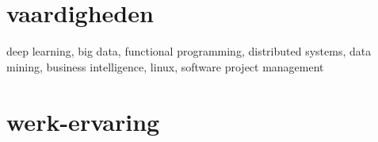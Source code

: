 \documentclass[]{friggeri-cv}
\begin{document}
\section{vaardigheden}

deep learning,
big data,
functional programming,
distributed systems,
data mining,
business intelligence,
linux,
software project management

\section{werk-ervaring}
\end{document}
